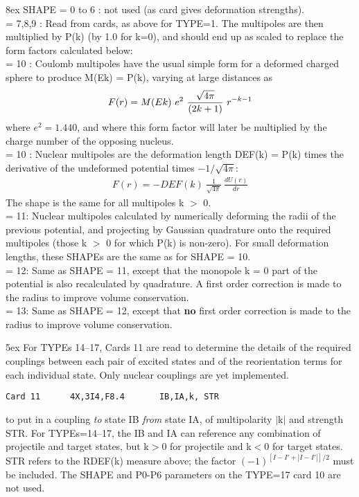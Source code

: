 \documentclass[11pt]{article}
\newcommand{\beqn}{\begin{eqnarray*}}
\newcommand{\eeqn}{\end{eqnarray*}}
\begin{document}
\hangindent 8ex
SHAPE
     = 0 to 6 : not used (as card gives deformation strengths).
\\
     = 7,8,9 : Read from cards, as above for TYPE=1.
The multipoles are then multiplied by P(k) (by 1.0 for k=0), and
should end up as scaled to replace the form factors calculated
below:
\\
= 10 : Coulomb multipoles have the usual simple form for a
deformed charged sphere to produce M(Ek) = P(k),
varying at large distances as
\beqn
      F(r) = M(Ek) ~ e^2 ~ {\sqrt{4\pi}   \over  (2k+1)}~  r^{-k-1}
\eeqn
where $e^2=1.440$, and where this form factor will later be multiplied
by the charge number of the opposing nucleus.
\\
= 10 : Nuclear multipoles are the deformation length DEF(k) = P(k)
times the derivative of the undeformed potential times $-1/\sqrt{4\pi}$:
\beqn
      F(r) = - DEF(k) ~  \frac{1}{\sqrt{4\pi}} ~ \frac{dU(r)}{dr}
\eeqn
The shape is the same for all multipoles k $>$ 0.
\\
= 11: Nuclear multipoles calculated by numerically deforming the radii
of the previous potential, and projecting by Gaussian quadrature
onto the required multipoles (those k $>$ 0 for which P(k) is non-zero).
For small deformation lengths, these SHAPEs are the same as for
SHAPE = 10.
\\
= 12: Same as SHAPE = 11, except that the monopole k = 0 part of
the potential is also recalculated by quadrature. A first order
correction is made to the radius to improve volume conservation.
\\
= 13: Same as SHAPE = 12, except that {\bf no} first order
correction is made to the radius to improve volume conservation.

\bigskip

\hangindent 5ex
For TYPEs 14--17, Cards 11 are read to determine the details of the
required couplings between each pair of excited states
and of the reorientation terms for each individual state.
Only nuclear couplings are yet implemented.
\begin{verbatim}
Card 11      4X,3I4,F8.4       IB,IA,k, STR
\end{verbatim}
to put in a coupling {\em to} state IB {\em from} state IA,
of multipolarity $|$k$|$ and strength STR. For TYPEs=14--17, the IB and IA
can reference any combination of projectile and target states,
but k$>$0 for projectile and k$<$0 for target states.
STR refers to the RDEF(k) measure above;
the factor  $(-1)^{ [I-I'+|I-I'|]/2}$ must be included.
The SHAPE and P0-P6 parameters on the TYPE=17 card 10 are not used.
\end{document}

